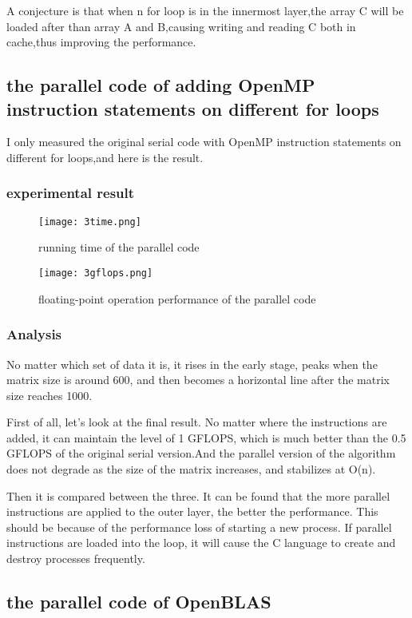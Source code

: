\documentclass[11pt]{scrartcl} %
\begin{document}
		A conjecture is that when n for loop is in the innermost layer,the array C will be loaded after than array A and B,causing writing and reading C both in cache,thus improving the performance.


\subsection{the parallel code of adding OpenMP instruction statements on different for loops}
	I only measured the original serial code with OpenMP instruction statements on different for loops,and here is the result.
	\subsubsection{experimental result}
		\begin{figure}[H]
			\centering
			\texttt{[image: 3time.png]}
			\caption{running time of the parallel code}
			\label{}
		\end{figure}
		\begin{figure}[H]
			\centering
			\texttt{[image: 3gflops.png]}
			\caption{floating-point operation performance of the parallel code}
			\label{}
		\end{figure}
	\subsubsection{Analysis}
	No matter which set of data it is, it rises in the early stage, peaks when the matrix size is around 600, and then becomes a horizontal line after the matrix size reaches 1000.

First of all, let's look at the final result. No matter where the instructions are added, it can maintain the level of 1 GFLOPS, which is much better than the 0.5 GFLOPS of the original serial version.And the parallel version of the algorithm does not degrade as the size of the matrix increases, and stabilizes at O(n).

Then it is compared between the three. It can be found that the more parallel instructions are applied to the outer layer, the better the performance. This should be because of the performance loss of starting a new process. If parallel instructions are loaded into the loop, it will cause the C language to create and destroy processes frequently.
\subsection{the parallel code of OpenBLAS}
\end{document}
